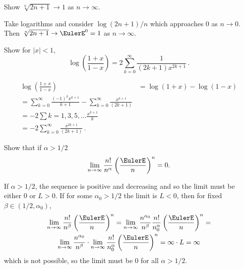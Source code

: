 \documentclass[12pt]{article}
\begin{document}
\begin{exercise}
    Show \( \sqrt[n]{2n+1} \to 1 \) as \( n \to \infty \).
\end{exercise}
\begin{solution}
    Take logarithms and consider \( \log(2n+1)/n \) which
    approaches \( 0 \) as \( n \to 0 \).  Then \( \sqrt[n]{2n+1}
    \to \EulerE^0 = 1 \) as \( n \to \infty \).
\end{solution}
\begin{exercise}
    Show for \( |x| < 1 \),
    \[
        \log\left(\frac{1+x}{1-x} \right) = 2 \sum_{k=0}^{\infty}
        \frac{1}{(2k+1)x^{2k+1} }\,.
    \]
\end{exercise}
\begin{solution}
    \begin{align*}
        \log\left(\frac{1+x}{1-x} \right) &= \log(1+x) - \log(1-x)\\
        = \sum_{k=0}^{\infty}\frac{(-1)^k x^{k+1} }{k+1} - \sum_
        {k=0}^{\infty}\frac{x^{k+1}}{(2k+1) }\\
        = -2 \sum{k=1,3,5,\dots} \frac{x^{k+1}}{k }\\
        = -2 \sum_{k=0}^{\infty} \frac{x^{2k+1}}{(2k+1) }\,.
    \end{align*}
\end{solution}
\begin{exercise}
Show that if \( \alpha > 1/2 \)
\[
    \lim_{n \to \infty}\frac{n!}{n^\alpha}\left( \frac{\EulerE}{n}
    \right)^n = 0.
  \]
\end{exercise}      
\begin{solution}
    If \( \alpha > 1/2 \), the sequence is positive and
    decreasing and so the limit must be either \( 0 \) or \( L
    >0 \).  If for some \( \alpha_0 > 1/2 \) the limit is \( L <
    0 \), then for fixed \( \beta \in (1/2, \alpha_0) \),
    \begin{multline*}
        \lim_{n \to \infty}\frac{n!}{n^\beta}\left( \frac{\EulerE}
        {n} \right)^n = \lim_{n \to \infty} \frac{n^{\alpha_0}}{n^
        {\beta}}\frac{n!}{n^\alpha_0}\left( \frac{\EulerE}{n}
        \right)^n = \\
        \lim_{n \to \infty} \frac{n^{\alpha_0}}{n^{\beta}} \cdot
        \lim_{n \to \infty}\frac{n!}{n^\alpha_0}\left( \frac{\EulerE}
        {n} \right)^n = \infty \cdot L = \infty
    \end{multline*}
    which is not possible, so the limit must be \( 0 \) for all \(
    \alpha > 1/2 \).
\end{solution}
\end{document}
